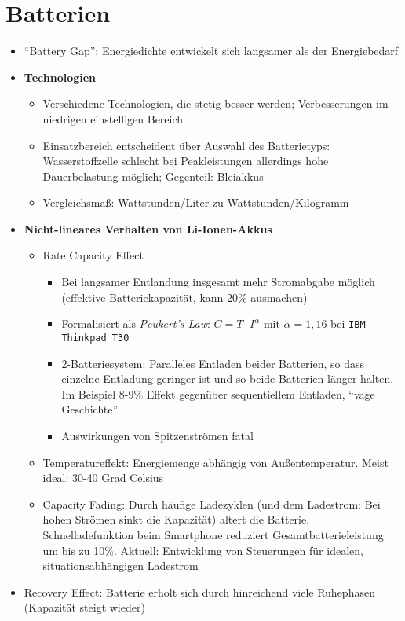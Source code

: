 \section{Batterien}
\begin{itemize}
	\item "`Battery Gap"': Energiedichte entwickelt sich langsamer als der Energiebedarf
	\item \textbf{Technologien}
	\begin{itemize}
		\item Verschiedene Technologien, die stetig besser werden; Verbesserungen im niedrigen einstelligen Bereich
		\item Einsatzbereich entscheident über Auswahl des Batterietyps: Wasserstoffzelle schlecht bei Peakleistungen allerdings hohe Dauerbelastung möglich; Gegenteil: Bleiakkus
		\item Vergleichsmaß: Wattstunden/Liter zu Wattstunden/Kilogramm
	\end{itemize}
	\item \textbf{Nicht-lineares Verhalten von Li-Ionen-Akkus}
	\begin{itemize}
		\item Rate Capacity Effect
		\begin{itemize}
			\item Bei langsamer Entlandung insgesamt mehr Stromabgabe möglich (effektive Batteriekapazität, kann \(20\%\) ausmachen)
			\item Formalisiert als \textit{Peukert's Law}: \(C=T \cdot I^\alpha\) mit \(\alpha=1,16\) bei \texttt{IBM Thinkpad T30}
			\item 2-Batteriesystem: Paralleles Entladen beider Batterien, so dass einzelne Entladung geringer ist und so beide Batterien länger halten. Im Beispiel 8-9\% Effekt gegenüber sequentiellem Entladen, "`vage Geschichte"'
			\item Auswirkungen von Spitzenströmen fatal
		\end{itemize}
		\item Temperatureffekt: Energiemenge abhängig von Außentemperatur. Meist ideal: 30-40 Grad Celsius
		\item Capacity Fading: Durch häufige Ladezyklen (und dem Ladestrom: Bei hohen Strömen sinkt die Kapazität) altert die Batterie. Schnelladefunktion beim Smartphone reduziert Gesamtbatterieleistung um bis zu 10\%. Aktuell: Entwicklung von Steuerungen für idealen, situationsabhängigen Ladestrom
	\end{itemize}
	\item Recovery Effect: Batterie erholt sich durch hinreichend viele Ruhephasen (Kapazität steigt wieder)

\end{itemize}
